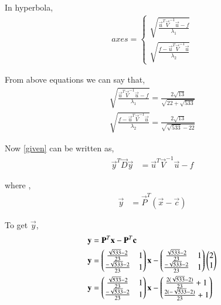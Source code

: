 \documentclass[journal,12pt,twocolumn]{IEEEtran}
\begin{document}
In hyperbola,
\begin{align}
axes=
\begin{cases}
\sqrt{\frac{\vec{u}^T\vec{V}^{-1}\vec{u}-f}{\lambda_1}}\\ \sqrt{\frac{f-\vec{u}^T\vec{V}^{-1}\vec{u}}{\lambda_2}}
\end{cases}
\end{align}

From above equations we can say that,
\begin{align}
\sqrt{\frac{\vec{u}^T\vec{V}^{-1}\vec{u}-f}{\lambda_1}}=\frac{2\sqrt{13}}{\sqrt{22+\sqrt{533}}}\\
\sqrt{\frac{f-\vec{u}^T\vec{V}^{-1}\vec{u}}{\lambda_2}}=\frac{2\sqrt{13}}{\sqrt{\sqrt{533}-22}}
\end{align}

Now \eqref{given} can be written as,
\begin{align}
    \vec{y}^T\vec{D}\vec{y}&=\vec{u}^T\vec{V}^{-1}\vec{u}-f\label{fi}
\end{align}

where ,
\begin{align}
    \vec{y}&=\vec{P}^T(\vec{x}-\vec{c})
\end{align}

To get $\vec{y}$,
\begin{align}
\mathbf{y}&=\mathbf{P}^T\mathbf{x}-\mathbf{P}^T\mathbf{c}\\
    \mathbf{y}&=\begin{pmatrix}\frac{\sqrt{533}-2}{23} & 1 \\ \frac{-\sqrt{533}-2}{23} & 1\end{pmatrix}\mathbf{x}-\begin{pmatrix}\frac{\sqrt{533}-2}{23} & 1 \\ \frac{-\sqrt{533}-2}{23} & 1\end{pmatrix}\begin{pmatrix}2\\1\end{pmatrix}\\
    \mathbf{y}&=\begin{pmatrix}\frac{\sqrt{533}-2}{23} & 1 \\ \frac{-\sqrt{533}-2}{23} & 1\end{pmatrix}\mathbf{x}-\begin{pmatrix}\frac{2(\sqrt{533}-2)}{23}+1  \\ \frac{2(-\sqrt{533}-2)}{23} + 1\end{pmatrix}
\end{align}
\end{document}
